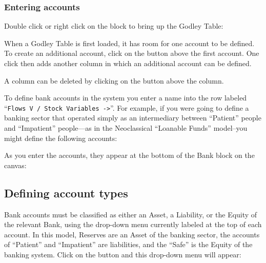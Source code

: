 
\subsubsection{Entering accounts}


Double click or right click on the  block
to bring up the Godley Table:

When a Godley Table is first loaded, it has room for one account to be
defined. To create an additional account, click on the
 button above the first account. One
click then adds another column in which an additional account can be
defined.



A column can be deleted by clicking on the  button above the column.

To define bank accounts in the system you enter a name into the row
labeled ``\verb+Flows V / Stock Variables ->+''. For example, if you were
going to define a banking sector that operated simply as an
intermediary between ``Patient'' people and ``Impatient'' people---as
in the Neoclassical ``Loanable Funds'' model--you might define the
following accounts: 


As you enter the accounts, they appear at the bottom of the Bank block on the canvas:


\subsection{Defining account types}

Bank accounts must be classified as either an Asset, a Liability, or
the Equity of the relevant Bank, using the drop-down menu currently
labeled  at the top of each account. In
this model, Reserves are an Asset of the banking sector, the accounts
of ``Patient'' and ``Impatient'' are liabilities, and the ``Safe'' is
the Equity of the banking system. Click on the
 button and this drop-down menu will
appear:

\begin{center}
\end{center}

